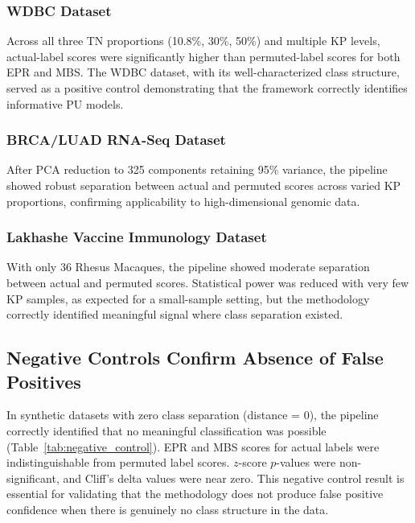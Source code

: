 \documentclass[12pt]{article}
\begin{document}
\subsubsection{WDBC Dataset}

Across all three TN proportions (10.8\%, 30\%, 50\%) and multiple KP levels, actual-label scores were significantly higher than permuted-label scores for both EPR and MBS. The WDBC dataset, with its well-characterized class structure, served as a positive control demonstrating that the framework correctly identifies informative PU models.

\subsubsection{BRCA/LUAD RNA-Seq Dataset}

After PCA reduction to 325 components retaining 95\% variance, the pipeline showed robust separation between actual and permuted scores across varied KP proportions, confirming applicability to high-dimensional genomic data.

\subsubsection{Lakhashe Vaccine Immunology Dataset}

With only 36 Rhesus Macaques, the pipeline showed moderate separation between actual and permuted scores. Statistical power was reduced with very few KP samples, as expected for a small-sample setting, but the methodology correctly identified meaningful signal where class separation existed.

\subsection{Negative Controls Confirm Absence of False Positives}

In synthetic datasets with zero class separation (distance = 0), the pipeline correctly identified that no meaningful classification was possible (Table~\ref{tab:negative_control}). EPR and MBS scores for actual labels were indistinguishable from permuted label scores. $z$-score $p$-values were non-significant, and Cliff's delta values were near zero. This negative control result is essential for validating that the methodology does not produce false positive confidence when there is genuinely no class structure in the data.
\end{document}
